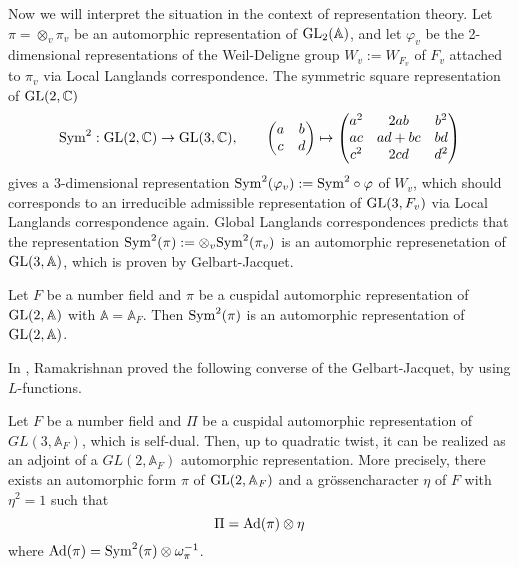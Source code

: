 Now we will interpret the situation in the context of representation theory.
Let $\pi = \otimes_{v} \pi_{v}$ be an automorphic representation of $\operatorname{\mathrm{GL}}_{2}(\mathbb{A})$, and let $\varphi_{v}$ be the 2-dimensional representations of the Weil-Deligne group $W_{v}:=W_{F_{v}}$ of $F_{v}$ attached to $\pi_{v}$ via Local Langlands correspondence.
The symmetric square representation of $\operatorname{\mathrm{GL}}(2, \mathbb{C})$
\begin{align*}
\mathrm{Sym}^{2}: \operatorname{\mathrm{GL}}(2, \mathbb{C}) \to \operatorname{\mathrm{GL}}(3, \mathbb{C}), \qquad
\begin{pmatrix}
a & b\\ c & d \end{pmatrix} \mapsto \begin{pmatrix}
a^{2} & 2ab & b^{2}\\ ac & ad + bc & bd\\ c^{2} & 2cd & d^{2} \end{pmatrix}
\end{align*}
gives a 3-dimensional representation $\mathrm{Sym}^{2}(\varphi_{v}):=\mathrm{Sym}^{2}\circ\varphi$ of $W_{v}$, which should corresponds to an irreducible admissible representation of $\operatorname{\mathrm{GL}}(3, F_{v})$ via Local Langlands correspondence again.
Global Langlands correspondences predicts that the representation $\mathrm{Sym}^{2}(\pi) := \otimes_{v} \mathrm{Sym}^{2}(\pi_{v})$ is an automorphic represenetation of $\operatorname{\mathrm{GL}}(3, \mathbb{A})$, which is proven by Gelbart-Jacquet.

\begin{theorem}
Let $F$ be a number field and $\pi$ be a cuspidal automorphic representation of $\operatorname{\mathrm{GL}}(2, \mathbb{A})$ with $\mathbb{A} = \mathbb{A}_{F}$.
Then $\mathrm{Sym}^{2}(\pi)$ is an automorphic representation of $\operatorname{\mathrm{GL}}(2, \mathbb{A})$.
\end{theorem}


In \cite{ramakrishnan2014exercise}, Ramakrishnan proved the following converse of the Gelbart-Jacquet, by using $L$-functions.
\begin{theorem}
Let $F$ be a number field and $\Pi$ be a cuspidal automorphic representation of $GL(3, \mathbb{A}_{F})$, which is self-dual.
Then, up to quadratic twist, it can be realized as an adjoint of a $GL(2, \mathbb{A}_{F})$ automorphic representation.
More precisely, there exists an automorphic form $\pi$ of $\operatorname{\mathrm{GL}}(2, \mathbb{A}_{F})$ and a gr\"ossencharacter $\eta$ of $F$ with $\eta^{2} = 1$ such that
$$
\Pi = \operatorname{\mathrm{Ad}}(\pi) \otimes \eta
$$
where $\operatorname{\mathrm{Ad}}(\pi) = \mathrm{Sym}^{2}(\pi) \otimes \omega_{\pi}^{-1}$.
\end{theorem}
